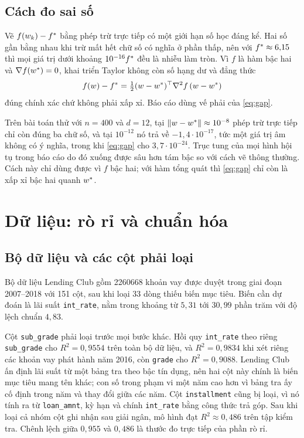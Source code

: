\documentclass[12pt, a4paper, oneside]{report}
\theoremstyle{definition}
\begin{document}
\section{Cách đo sai số}

Vẽ $f(w_k) - f^{*}$ bằng phép trừ trực tiếp có một giới hạn số học đáng kể. Hai
số gần bằng nhau khi trừ mất hết chữ số có nghĩa ở phần thấp, nên với
$f^{*} \approx 6{,}15$ thì mọi giá trị dưới khoảng $10^{-16} f^{*}$ đều là
nhiễu làm tròn. Vì $f$ là hàm bậc hai và $\nabla f(w^{*}) = 0$, khai triển
Taylor không còn số hạng dư và đẳng thức
\begin{equation}\label{eq:gap}
  f(w) - f^{*} = \tfrac{1}{2} (w - w^{*})^{\top} \nabla^{2} f \, (w - w^{*})
\end{equation}
đúng chính xác chứ không phải xấp xỉ. Báo cáo dùng vế phải của \eqref{eq:gap}.

Trên bài toán thử với $n = 400$ và $d = 12$, tại
$\lVert w - w^{*}\rVert \approx 10^{-8}$ phép trừ trực tiếp chỉ còn đúng ba chữ số, và tại $10^{-12}$ nó trả về $-1{,}4 \cdot 10^{-17}$, tức một giá
trị âm không có ý nghĩa, trong khi \eqref{eq:gap} cho $3{,}7 \cdot 10^{-24}$.
Trục tung của mọi hình hội tụ trong báo cáo do đó xuống được sâu hơn tám bậc so
với cách vẽ thông thường. Cách này chỉ dùng được vì $f$ bậc hai; với hàm tổng
quát thì \eqref{eq:gap} chỉ còn là xấp xỉ bậc hai quanh $w^{*}$.

\chapter{Dữ liệu: rò rỉ và chuẩn hóa}

\section{Bộ dữ liệu và các cột phải loại}

Bộ dữ liệu Lending Club gồm \num{2260668} khoản vay được duyệt trong giai đoạn
2007--2018 với 151 cột, sau khi loại 33 dòng thiếu biến mục tiêu. Biến cần dự
đoán là lãi suất \texttt{int\_rate}, nằm trong khoảng từ $5{,}31$ tới $30{,}99$
phần trăm với độ lệch chuẩn $4{,}83$.

Cột \texttt{sub\_grade} phải loại trước mọi bước khác. Hồi quy \texttt{int\_rate}
theo riêng \texttt{sub\_grade} cho $R^{2} = 0{,}9554$ trên toàn bộ dữ liệu, và
$R^{2} = 0{,}9834$ khi xét riêng các khoản vay phát hành năm 2016, còn
\texttt{grade} cho $R^{2} = 0{,}9088$. Lending Club ấn định lãi suất từ một bảng
tra theo bậc tín dụng, nên hai cột này chính là biến mục tiêu mang tên khác; con số trong phạm vi một năm cao hơn vì bảng tra ấy cố định trong
năm và thay đổi giữa các năm. Cột \texttt{installment} cũng bị loại, vì nó tính
ra từ \texttt{loan\_amnt}, kỳ hạn và chính \texttt{int\_rate} bằng công thức trả
góp. Sau khi loại cả nhóm cột ghi nhận sau giải ngân, mô hình đạt
$R^{2} \approx 0{,}486$ trên tập kiểm tra. Chênh lệch giữa $0{,}955$ và $0{,}486$
là thước đo trực tiếp của phần rò rỉ.
\end{document}
